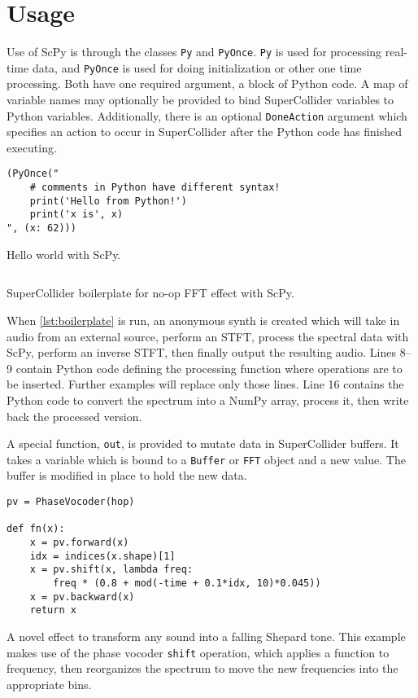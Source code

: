 \documentclass{article}
\begin{document}
\section{Usage}\label{sec:usage}

Use of ScPy is through the classes \texttt{Py} and \texttt{PyOnce}. \texttt{Py} is used for
processing real-time data, and \texttt{PyOnce} is used for doing initialization or other one time
processing. Both have one required argument, a block of Python code. A map of variable names may
optionally be provided to bind SuperCollider variables to Python variables. Additionally, there is
an optional \texttt{DoneAction} argument which specifies an action to occur in SuperCollider after
the Python code has finished executing.

\begin{listing}[ht]
    \begin{verbatim}
(PyOnce("
    # comments in Python have different syntax!
    print('Hello from Python!')
    print('x is', x)
", (x: 62)))
    \end{verbatim}
    \caption{Hello world with ScPy.}
    \label{lst:helloworld}
\end{listing}

\begin{listing}[ht]
    \inputminted[linenos=true]{SuperCollider}{../examples/template.sc}
    \caption{SuperCollider boilerplate for no-op FFT effect with ScPy.}
    \label{lst:boilerplate}
\end{listing}

When \autoref{lst:boilerplate} is run, an anonymous synth is created which will take in audio
from an external source, perform an STFT, process the spectral data with ScPy, perform an inverse
STFT, then finally output the resulting audio. Lines 8--9 contain Python code defining the
processing function where operations are to be inserted. Further examples will replace only those
lines. Line 16 contains the Python code to convert the spectrum into a NumPy array, process it,
then write back the processed version.

A special function, \texttt{out}, is provided to mutate data in SuperCollider buffers. It takes a
variable which is bound to a \texttt{Buffer} or \texttt{FFT} object and a new value. The buffer is
modified in place to hold the new data.

\begin{listing}[ht]
    \begin{verbatim}
pv = PhaseVocoder(hop)

def fn(x):
    x = pv.forward(x)
    idx = indices(x.shape)[1]
    x = pv.shift(x, lambda freq:
        freq * (0.8 + mod(-time + 0.1*idx, 10)*0.045))
    x = pv.backward(x)
    return x
    \end{verbatim}
    \caption{A novel effect to transform any sound into a falling Shepard tone. This example makes
    use of the phase vocoder \texttt{shift} operation, which applies a function to frequency, then
    reorganizes the spectrum to move the new frequencies into the appropriate bins.}
    \label{lst:shepard}
\end{listing}
\end{document}
